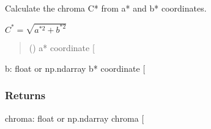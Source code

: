 \documentclass[letterpaper,10pt,english]{sphinxmanual}
\begin{document}

\begin{fulllineitems}
\label{\detokenize{07_colors:skinoptics.colors.chroma}}
\pysigstartsignatures
{}
\pysigstopsignatures
\sphinxAtStartPar
Calculate the chroma C* from a* and b* coordinates.

\sphinxAtStartPar
\(C^* = \sqrt{a^{*2} + b^{*2}}\)
\begin{quote}\begin{description}
\sphinxAtStartPar
{} () \textendash{} a* coordinate {[}\sphinxhyphen{}{]}

\end{description}\end{quote}

\sphinxAtStartPar
b: float or np.ndarray
b* coordinate {[}\sphinxhyphen{}{]}


\subsubsection{Returns}
\label{\detokenize{07_colors:id22}}
\sphinxAtStartPar
chroma: float or np.ndarray
chroma {[}\sphinxhyphen{}{]}

\end{fulllineitems}

\end{document}
